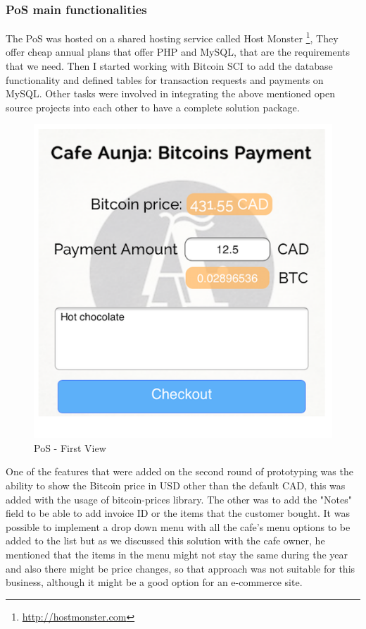 \subsubsection{PoS main functionalities}
The PoS was hosted on a shared hosting service called Host Monster \footnote{\url{http://hostmonster.com}}, They offer cheap annual plans that offer PHP and MySQL, that are the requirements that we need.
Then I started working with Bitcoin SCI to add the database functionality and defined tables for transaction requests and payments on MySQL.
Other tasks were involved in integrating the above mentioned open source projects into each other to have a complete solution package.

\begin{figure}[h]
\centering
\includegraphics[scale=0.5]{fig/First_View.png}
  \caption{PoS - First View}
\label{fig:First_View}
\end{figure}

One of the features that were added on the second round of prototyping was the ability to show the Bitcoin price in USD other than the default CAD, this was added with the usage of bitcoin-prices library. The other was to add the "Notes" field to be able to add invoice ID or the items that the customer bought. It was possible to implement a drop down menu with all the cafe's menu options to be added to the list but as we discussed this solution with the cafe owner, he mentioned that the items in the menu might not stay the same during the year and also there might be price changes, so that approach was not suitable for this business, although it might be a good option for an e-commerce site.

